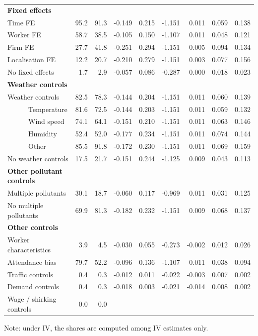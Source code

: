 \documentclass[
]{article}
\begin{document}
\begin{table}[t]
\begin{tabular*}{\linewidth}{@{\extracolsep{\fill}}l|rrrrrrrr}
{\bfseries Fixed effects} &  &  & {} &  &  &  &  &  \\ 
   Time FE & 95.2 & 91.3 & {-0.149} & 0.215 & -1.151 & 0.011 & 0.059 & 0.138 \\ 
   Worker FE & 58.7 & 38.5 & {-0.105} & 0.150 & -1.107 & 0.011 & 0.048 & 0.121 \\ 
   Firm FE & 27.7 & 41.8 & {-0.251} & 0.294 & -1.151 & 0.005 & 0.094 & 0.134 \\ 
   Localisation FE & 12.2 & 20.7 & {-0.210} & 0.279 & -1.151 & 0.003 & 0.077 & 0.156 \\ 
   No fixed effects & 1.7 & 2.9 & {-0.057} & 0.086 & -0.287 & 0.000 & 0.018 & 0.023 \\ 
{\bfseries Weather controls} &  &  & {} &  &  &  &  &  \\ 
   Weather controls & 82.5 & 78.3 & {-0.144} & 0.204 & -1.151 & 0.011 & 0.060 & 0.139 \\ 
         Temperature & 81.6 & 72.5 & {-0.144} & 0.203 & -1.151 & 0.011 & 0.059 & 0.132 \\ 
         Wind speed & 74.1 & 64.1 & {-0.151} & 0.210 & -1.151 & 0.011 & 0.063 & 0.146 \\ 
         Humidity & 52.4 & 52.0 & {-0.177} & 0.234 & -1.151 & 0.011 & 0.074 & 0.144 \\ 
         Other & 85.5 & 91.8 & {-0.172} & 0.230 & -1.151 & 0.011 & 0.069 & 0.159 \\ 
   No weather controls & 17.5 & 21.7 & {-0.151} & 0.244 & -1.125 & 0.009 & 0.043 & 0.113 \\ 
{\bfseries Other pollutant controls} &  &  & {} &  &  &  &  &  \\ 
   Multiple pollutants & 30.1 & 18.7 & {-0.060} & 0.117 & -0.969 & 0.011 & 0.031 & 0.125 \\ 
   No multiple pollutants & 69.9 & 81.3 & {-0.182} & 0.232 & -1.151 & 0.009 & 0.068 & 0.137 \\ 
{\bfseries Other controls} &  &  & {} &  &  &  &  &  \\ 
   Worker characteristics & 3.9 & 4.5 & {-0.030} & 0.055 & -0.273 & -0.002 & 0.012 & 0.026 \\ 
   Attendance bias & 79.7 & 52.2 & {-0.096} & 0.136 & -1.107 & 0.011 & 0.038 & 0.094 \\ 
   Traffic controls & 0.4 & 0.3 & {-0.012} & 0.011 & -0.022 & -0.003 & 0.007 & 0.002 \\ 
   Demand controls & 0.4 & 0.3 & {-0.018} & 0.003 & -0.021 & -0.014 & 0.008 & 0.002 \\ 
   Wage / shirking controls & 0.0 & 0.0 & {} &  &  &  &  &  \\ 
\bottomrule
\end{tabular*}
\begin{minipage}{\linewidth}
\vspace{.05em}
Note: under IV, the shares are computed among IV estimates only.\\
\end{minipage}
\end{table}
\end{document}
